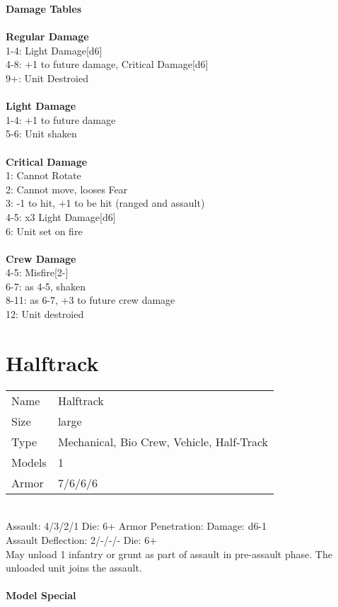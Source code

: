 {\bf Damage Tables} \\
\ \\ {\bf Regular Damage } \\
1-4: Light Damage[d6] \\
4-8: +1 to future damage, Critical Damage[d6] \\
9+: Unit Destroied \\
\ \\ {\bf Light Damage } \\
1-4: +1 to future damage \\
5-6: Unit shaken \\
\ \\ {\bf Critical Damage } \\
1: Cannot Rotate \\
2: Cannot move, looses Fear \\
3: -1 to hit, +1 to be hit (ranged and assault) \\
4-5: x3 Light Damage[d6] \\
6: Unit set on fire \\
\ \\ {\bf Crew Damage } \\
4-5: Misfire[2-] \\
6-7: as 4-5, shaken \\
8-11: as 6-7, +3 to future crew damage \\
12: Unit destroied \\










\pagebreak

\section{ Halftrack }

\begin{tabular}{ll}
  Name & Halftrack \\
  Size & large\\
  Type & Mechanical, Bio Crew, Vehicle, Half-Track\\
  Models & 1\\
  Armor & 7/6/6/6\\
\end{tabular}



\ \\
Assault: 4/3/2/1 Die: 6+ Armor Penetration:  Damage: d6-1 \\
Assault Deflection: 2/-/-/- Die: 6+\\
\indent May unload 1 infantry or grunt as part of assault in pre-assault phase. The unloaded unit joins the assault. \\
\ \\
{\bf Model Special} \\

